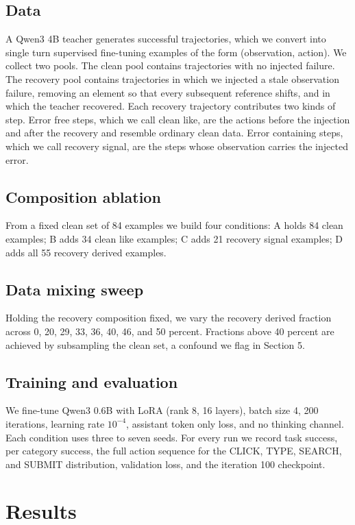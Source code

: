 \documentclass[11pt]{article}
\begin{document}
\subsection{Data}
A Qwen3 4B teacher generates successful trajectories, which we convert into
single turn supervised fine-tuning examples of the form (observation, action).
We collect two pools. The clean pool contains trajectories with no injected
failure. The recovery pool contains trajectories in which we injected a stale
observation failure, removing an element so that every subsequent reference
shifts, and in which the teacher recovered. Each recovery trajectory
contributes two kinds of step. Error free steps, which we call clean like, are
the actions before the injection and after the recovery and resemble ordinary
clean data. Error containing steps, which we call recovery signal, are the
steps whose observation carries the injected error.

\subsection{Composition ablation}
From a fixed clean set of 84 examples we build four conditions: A holds 84 clean
examples; B adds 34 clean like examples; C adds 21 recovery signal examples; D
adds all 55 recovery derived examples.

\subsection{Data mixing sweep}
Holding the recovery composition fixed, we vary the recovery derived fraction
across 0, 20, 29, 33, 36, 40, 46, and 50 percent. Fractions above 40 percent are
achieved by subsampling the clean set, a confound we flag in Section 5.

\subsection{Training and evaluation}
We fine-tune Qwen3 0.6B with LoRA (rank 8, 16 layers), batch size 4, 200
iterations, learning rate $10^{-4}$, assistant token only loss, and no thinking
channel. Each condition uses three to seven seeds. For every run we record task
success, per category success, the full action sequence for the CLICK, TYPE,
SEARCH, and SUBMIT distribution, validation loss, and the iteration 100
checkpoint.

\section{Results}
\end{document}
